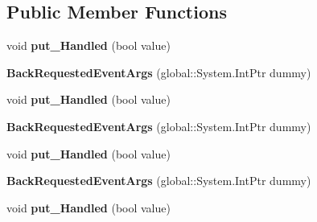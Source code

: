 \subsection*{Public Member Functions}
\begin{DoxyCompactItemize}
\item 
\mbox{\label{class_windows_1_1_u_i_1_1_core_1_1_back_requested_event_args_ac33fd05b1cfdb71ff37e8ece87d7c2ce}} 
void {\bfseries put\+\_\+\+Handled} (bool value)
\item 
\mbox{\label{class_windows_1_1_u_i_1_1_core_1_1_back_requested_event_args_a7db6ca09f29ccbee05000b227ff44577}} 
{\bfseries Back\+Requested\+Event\+Args} (global\+::\+System.\+Int\+Ptr dummy)
\item 
\mbox{\label{class_windows_1_1_u_i_1_1_core_1_1_back_requested_event_args_ac33fd05b1cfdb71ff37e8ece87d7c2ce}} 
void {\bfseries put\+\_\+\+Handled} (bool value)
\item 
\mbox{\label{class_windows_1_1_u_i_1_1_core_1_1_back_requested_event_args_a7db6ca09f29ccbee05000b227ff44577}} 
{\bfseries Back\+Requested\+Event\+Args} (global\+::\+System.\+Int\+Ptr dummy)
\item 
\mbox{\label{class_windows_1_1_u_i_1_1_core_1_1_back_requested_event_args_ac33fd05b1cfdb71ff37e8ece87d7c2ce}} 
void {\bfseries put\+\_\+\+Handled} (bool value)
\item 
\mbox{\label{class_windows_1_1_u_i_1_1_core_1_1_back_requested_event_args_a7db6ca09f29ccbee05000b227ff44577}} 
{\bfseries Back\+Requested\+Event\+Args} (global\+::\+System.\+Int\+Ptr dummy)
\item 
\mbox{\label{class_windows_1_1_u_i_1_1_core_1_1_back_requested_event_args_ac33fd05b1cfdb71ff37e8ece87d7c2ce}} 
void {\bfseries put\+\_\+\+Handled} (bool value)
\item 

\end{DoxyCompactItemize}
